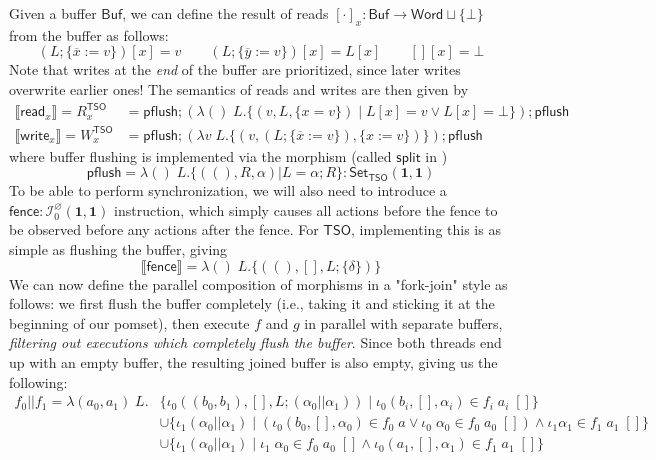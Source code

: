 \documentclass[acmsmall,screen,review]{acmart}
\newcommand{\mc}[1]{\ensuremath{\mathcal{#1}}}
\newcommand{\mb}[1]{\ensuremath{\mathbf{#1}}}
\newcommand{\ms}[1]{\ensuremath{\mathsf{#1}}}
\newcommand{\dnt}[1]{\llbracket{#1}\rrbracket}
\newcommand{\bufloc}[1]{\overline{#1}}
\begin{document}
Given a buffer \(\ms{Buf}\), we can define the result of reads \([\cdot]_x:
\ms{Buf} \to \ms{Word} \sqcup \{\bot\}\) from the buffer as follows:
\begin{equation}
  (L;\{\bufloc{x} := v\})[x] = v
  \qquad
  (L;\{\bufloc{y} := v\})[x] = L[x]
  \qquad
  [][x] = \bot
\end{equation}
Note that writes at the \textit{end} of the buffer are prioritized, since later
writes overwrite earlier ones! The semantics of reads and writes are then given
by
\begin{equation}
  \begin{aligned}
  \dnt{\ms{read}_x} = R_x^{\ms{TSO}} 
    &= \ms{pflush};(\lambda ()\;L. \{(v, L, \{x = v\}) \mid L[x] = v \lor L[x] = \bot\});\ms{pflush} \\
  \dnt{\ms{write}_x} = W_x^{\ms{TSO}}
    &= \ms{pflush};(\lambda v\;L. \{(v, (L;\{\bufloc{x} := v\}), \{x := v\})\});\ms{pflush}
  \end{aligned}
\end{equation}
where buffer flushing is implemented via the morphism (called \(\ms{split}\) in
\cite{sparky})
\begin{equation}
  \ms{pflush} = \lambda ()\;L. \{((), R, \alpha) | L = \alpha;R\}
  : \ms{Set}_{\ms{TSO}}(\mb{1}, \mb{1})
\end{equation}
To be able to perform synchronization, we will also need to introduce a \(\ms{fence}: \mc{I}^\varnothing_0(\mb{1}, \mb{1})\) instruction, which simply causes all actions before the fence to be observed before any actions after the fence. For \(\ms{TSO}\), implementing this is as simple as flushing the buffer, giving
\begin{equation}
  \dnt{\ms{fence}} = \lambda ()\;L. \{((), [], L;\{\delta\})\}
\end{equation}
We can now define the parallel composition of morphisms in a "fork-join" style as follows: we first flush the buffer completely (i.e., taking it and sticking it at the beginning of our pomset), then execute \(f\) and \(g\) in parallel with separate buffers, \textit{filtering out executions which completely flush the buffer}. Since both threads end up with an empty buffer, the resulting joined buffer is also empty, giving us the following:
\begin{equation}
  \begin{aligned}
    f_0 || f_1 = \lambda (a_0, a_1)\;L. 
    & \{\iota_0 ((b_0, b_1), [], L;(\alpha_0 || \alpha_1)) 
      \mid \iota_0 (b_i, [], \alpha_i) \in f_i\;a_i\;[]\} 
    \\ & \cup \{\iota_1 (\alpha_0 || \alpha_1) \mid (\iota_0 (b_0, [], \alpha_0) \in f_0\;a \lor \iota_0\;\alpha_0 \in f_0\;a_0\;[]) \land \iota_1 \alpha_1 \in f_1\;a_1\;[]\} 
    \\ & \cup \{\iota_1 (\alpha_0 || \alpha_1) \mid \iota_1\;\alpha_0 \in f_0\;a_0\;[] \land \iota_0 (a_1, [], \alpha_1) \in f_1\;a_1\;[]\}
    \end{aligned}
\end{equation}
\end{document}
